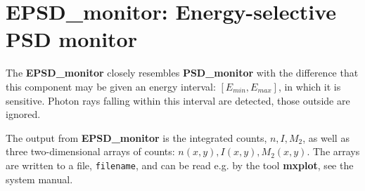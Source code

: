 \section{EPSD\_monitor: Energy-selective PSD monitor}


The \textbf{EPSD\_monitor} closely resembles \textbf{PSD\_monitor} with the difference that
this component may be given an energy interval: $\left[E_{min},E_{max}\right]$, in which it is sensitive.
Photon rays falling within this interval are detected, those outside are ignored.

The output from \textbf{EPSD\_monitor} is the integrated counts, $n, I, M_2$,
as well as
three two-dimensional arrays of counts: $n(x,y), I(x,y), M_2(x,y)$.
The arrays are written to a file, \verb+filename+, and can be read e.g. by the tool
\textbf{mxplot}, see the system manual.
  
